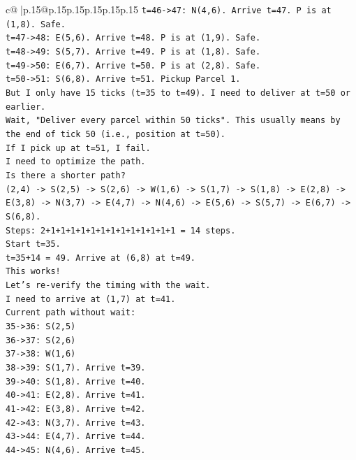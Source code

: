 \documentclass{article}
\begin{document}
{\begin{supertabular}{c@{$\;$}|p{.15\linewidth}@{}p{.15\linewidth}p{.15\linewidth}p{.15\linewidth}p{.15\linewidth}p{.15\linewidth}}
{{{\texttt{t=46{-}>47: N(4,6). Arrive t=47. P is at (1,8). Safe.} \\
\texttt{t=47{-}>48: E(5,6). Arrive t=48. P is at (1,9). Safe.} \\
\texttt{t=48{-}>49: S(5,7). Arrive t=49. P is at (1,8). Safe.} \\
\texttt{t=49{-}>50: E(6,7). Arrive t=50. P is at (2,8). Safe.} \\
\texttt{t=50{-}>51: S(6,8). Arrive t=51. Pickup Parcel 1.} \\
\texttt{But I only have 15 ticks (t=35 to t=49). I need to deliver at t=50 or earlier.} \\
\texttt{Wait, "Deliver every parcel within 50 ticks". This usually means by the end of tick 50 (i.e., position at t=50).} \\
\texttt{If I pick up at t=51, I fail.} \\
\texttt{I need to optimize the path.} \\
\texttt{Is there a shorter path?} \\
\texttt{(2,4) {-}> S(2,5) {-}> S(2,6) {-}> W(1,6) {-}> S(1,7) {-}> S(1,8) {-}> E(2,8) {-}> E(3,8) {-}> N(3,7) {-}> E(4,7) {-}> N(4,6) {-}> E(5,6) {-}> S(5,7) {-}> E(6,7) {-}> S(6,8).} \\
\texttt{Steps: 2+1+1+1+1+1+1+1+1+1+1+1+1+1 = 14 steps.} \\
\texttt{Start t=35.} \\
\texttt{t=35+14 = 49. Arrive at (6,8) at t=49.} \\
\texttt{This works!} \\
\texttt{Let's re{-}verify the timing with the wait.} \\
\texttt{I need to arrive at (1,7) at t=41.} \\
\texttt{Current path without wait:} \\
\texttt{35{-}>36: S(2,5)} \\
\texttt{36{-}>37: S(2,6)} \\
\texttt{37{-}>38: W(1,6)} \\
\texttt{38{-}>39: S(1,7). Arrive t=39.} \\
\texttt{39{-}>40: S(1,8). Arrive t=40.} \\
\texttt{40{-}>41: E(2,8). Arrive t=41.} \\
\texttt{41{-}>42: E(3,8). Arrive t=42.} \\
\texttt{42{-}>43: N(3,7). Arrive t=43.} \\
\texttt{43{-}>44: E(4,7). Arrive t=44.} \\
\texttt{44{-}>45: N(4,6). Arrive t=45.} \\
}}}
\end{supertabular}}
\end{document}
